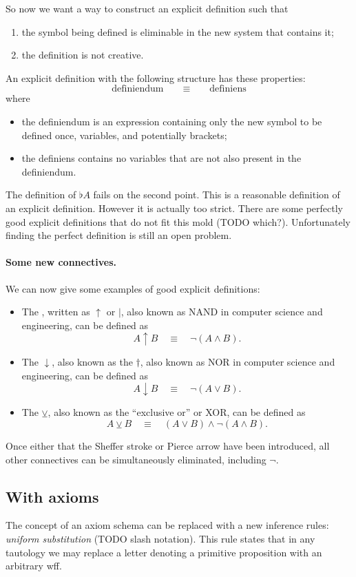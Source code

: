 So now we want a way to construct an explicit definition such that
\begin{enumerate}
\item the symbol being defined is eliminable in the new system that contains it;
\item the definition is not creative.
\end{enumerate}
An explicit definition with the following structure has these properties:
\[ \text{definiendum} \qquad \equiv \qquad \text{definiens} \]
where
\begin{itemize}
\item the definiendum is an expression containing only the new symbol to be defined once, variables, and potentially brackets;
\item the definiens contains no variables that are not also present in the definiendum.
\end{itemize}
The definition of $\flat A$ fails on the second point. This is a reasonable definition of an explicit definition. However it is actually too strict. There are some perfectly good explicit definitions that do not fit this mold (TODO which?). Unfortunately finding the perfect definition is still an open problem.

\paragraph{Some new connectives.}
We can now give some examples of good explicit definitions:
\begin{itemize}
\item The , written as $\uparrow$ or $|$, also known as NAND in computer science and engineering, can be defined as
\[ A \uparrow B \quad\equiv\quad \neg(A\land B). \]
\item The  $\downarrow$, also known as the  $\dagger$, also known as NOR in computer science and engineering, can be defined as
\[ A \downarrow B \quad\equiv\quad \neg (A \lor B). \]
\item The  $\veebar$, also known as the ``exclusive or'' or XOR, can be defined as
\[ A \veebar B \quad\equiv\quad (A \lor B) \land \neg (A \land B). \]
\end{itemize}
Once either that the Sheffer stroke or Pierce arrow have been introduced, all other connectives can be simultaneously eliminated, including $\neg$.

\subsection{With axioms}
The concept of an axiom schema can be replaced with a new inference rules: \textit{uniform substitution} (TODO slash notation). This rule states that in any tautology we may replace a letter denoting a primitive proposition with an arbitrary wff.

